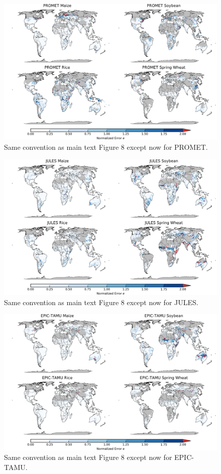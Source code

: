 \documentclass[10pt]{article}
\begin{document}
\begin{figure}[h!]
\centering
\includegraphics[width=15.5cm]{PROMET_spatial_error.png}
\caption{Same convention as main text Figure 8 except now for PROMET.}
\label{fig:lpjmlnorm}
\end{figure}

\begin{figure}[h!]
\centering
\includegraphics[width=15.5cm]{JULES_spatial_error.png}
\caption{Same convention as main text Figure 8 except now for JULES.}
\label{fig:lpjmlnorm}
\end{figure}

\begin{figure}[h!]
\centering
\includegraphics[width=15.5cm]{EPIC-TAMU_spatial_error.png}
\caption{Same convention as main text Figure 8 except now for EPIC-TAMU.}
\label{fig:lpjmlnorm}
\end{figure}
\end{document}
